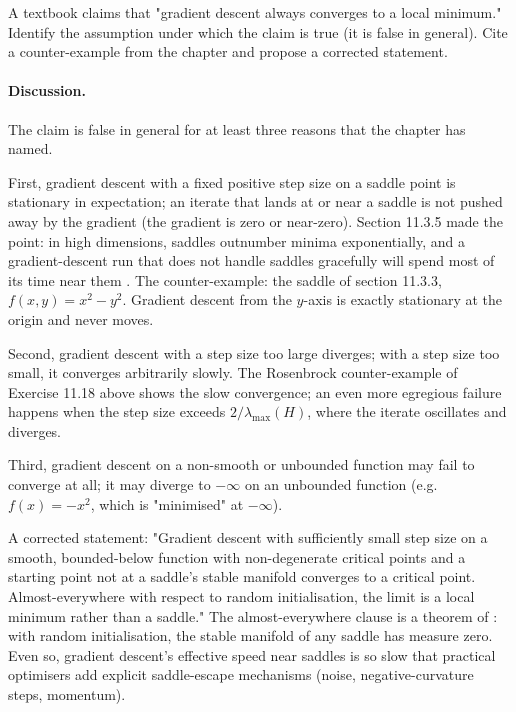 \begin{exercise}
A textbook claims that "gradient descent always converges to a
local minimum." Identify the assumption under which the claim is
true (it is false in general). Cite a counter-example from the
chapter and propose a corrected statement.

\paragraph{Discussion.} The claim is false in general for at least
three reasons that the chapter has named.

First, gradient descent with a fixed positive step size on a saddle
point is stationary in expectation; an iterate that lands at or
near a saddle is not pushed away by the gradient (the gradient is
zero or near-zero). Section 11.3.5 made the point: in high
dimensions, saddles outnumber minima exponentially, and a
gradient-descent run that does not handle saddles gracefully will
spend most of its time near them
\cite{paper:v2ch11-dauphin-saddle-2014}. The counter-example: the
saddle of section 11.3.3, $f(x, y) = x^{2} - y^{2}$. Gradient
descent from the $y$-axis is exactly stationary at the origin and
never moves.

Second, gradient descent with a step size too large diverges; with
a step size too small, it converges arbitrarily slowly. The
Rosenbrock counter-example of Exercise 11.18 above shows the slow
convergence; an even more egregious failure happens when the step
size exceeds $2/\lambda_{\max}(H)$, where the iterate oscillates
and diverges.

Third, gradient descent on a non-smooth or unbounded function may
fail to converge at all; it may diverge to $-\infty$ on an
unbounded function (e.g.\ $f(x) = -x^{2}$, which is "minimised" at
$-\infty$).

A corrected statement: "Gradient descent with sufficiently small
step size on a smooth, bounded-below function with non-degenerate
critical points and a starting point not at a saddle's stable
manifold converges to a critical point. Almost-everywhere with
respect to random initialisation, the limit is a local minimum
rather than a saddle." The almost-everywhere clause is a theorem of
\textcite{paper:v2c11-lee-saddle-2016}: with random initialisation,
the stable manifold of any saddle has measure zero. Even so,
gradient descent's effective speed near saddles is so slow that
practical optimisers add explicit saddle-escape mechanisms (noise,
negative-curvature steps, momentum).
\end{exercise}

